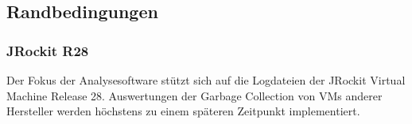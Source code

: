\subsection{Randbedingungen}\label{randbedingungen}
\subsubsection{JRockit R28}
Der Fokus der Analysesoftware stützt sich auf die Logdateien der JRockit Virtual Machine Release 28. Auswertungen der Garbage Collection von VMs anderer Hersteller werden höchstens zu einem späteren Zeitpunkt implementiert. 





